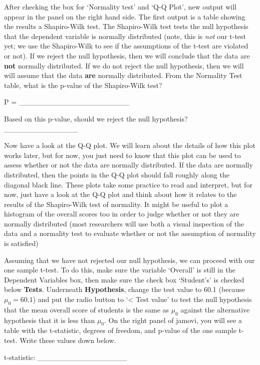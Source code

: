 \documentclass[
]{scrbook}
\begin{document}
After checking the box for `Normality test' and `Q-Q Plot', new output will appear in the panel on the right hand side.
The first output is a table showing the results a Shapiro-Wilk test.
The Shapiro-Wilk test tests the null hypothesis that the dependent variable is normally distributed (note, this is \emph{not} our t-test yet; we use the Shapiro-Wilk to see if the assumptions of the t-test are violated or not).
If we reject the null hypothesis, then we will conclude that the data are \textbf{not} normally distributed.
If we do not reject the null hypothesis, then we will will assume that the data \textbf{are} normally distributed.
From the Normality Test table, what is the p-value of the Shapiro-Wilk test?

P = \_\_\_\_\_\_\_\_\_\_\_\_\_\_\_\_\_\_\_\_\_

Based on this p-value, should we reject the null hypothesis? \_\_\_\_\_\_\_\_\_\_\_\_\_\_

Now have a look at the Q-Q plot.
We will learn about the details of how this plot works later, but for now, you just need to know that this plot can be used to assess whether or not the data are normally distributed.
If the data are normally distributed, then the points in the Q-Q plot should fall roughly along the diagonal black line.
These plots take some practice to read and interpret, but for now, just have a look at the Q-Q plot and think about how it relates to the results of the Shapiro-Wilk test of normality.
It might be useful to plot a histogram of the overall scores too in order to judge whether or not they are normally distributed (most researchers will use both a visual inspection of the data and a normality test to evaluate whether or not the assumption of normality is satisfied)

Assuming that we have not rejected our null hypothesis, we can proceed with our one sample t-test.
To do this, make sure the variable `Overall' is still in the Dependent Variables box, then make sure the check box `Student's' is checked below \textbf{Tests}.
Underneath \textbf{Hypothesis}, change the test value to 60.1 (because \(\mu_{0} = 60.1\)) and put the radio button to `\textless{} Test value' to test the null hypothesis that the mean overall score of students is the same as \(\mu_{0}\) against the alternative hypothesis that it is less than \(\mu_{0}\).
On the right panel of jamovi, you will see a table with the t-statistic, degrees of freedom, and p-value of the one sample t-test.
Write these values down below.

t-statistic: \_\_\_\_\_\_\_\_\_\_\_\_\_\_\_\_\_
\end{document}
